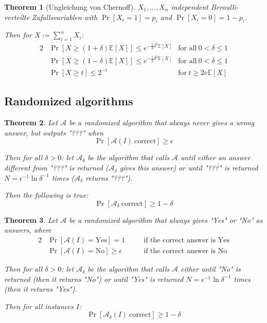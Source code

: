 \documentclass[12pt]{extarticle}
\theoremstyle{definition}
\theoremstyle{remark}
\theoremstyle{plain}
\newtheorem{theorem}{Theorem}
\theoremstyle{plain}
\theoremstyle{plain}
\newcommand{\E}{\mathbb{E}}
\begin{document}
\begin{theorem}[Ungleichung von Chernoff]
    $X_1, ..., X_n$ independent Beroulli-verteilte Zufallsvariablen with $\Pr[X_i = 1] = p_i$ and $\Pr[X_i = 0] = 1 - p_i$.

    Then for $X := \sum_{i=1}^n X_i$:
    \begin{alignat}{2}
         & \Pr[X \ge (1 + \delta)\E[X]] \le e^{-\frac{1}{3} \delta^2 \E[X]} & \mbox{for all}\ 0 < \delta \le 1 \\
         & \Pr[X \ge (1 - \delta)\E[X]] \le e^{-\frac{1}{2} \delta^2 \E[X]} & \mbox{for all}\ 0 < \delta \le 1 \\
         & \Pr[X \ge t] \le 2^{-t}                                          & \mbox{for}\ t \ge 2e \E[X]
    \end{alignat}
\end{theorem}

\subsection{Randomized algorithms}
\begin{theorem}
    Let $\mathcal{A}$ be a randomized algorithm that always never gives a wrong answer, but outputs "???" when
    \[ \Pr[\mathcal{A}(I)\ \mbox{correct}] \ge \epsilon \]

    Then for all $\delta > 0$:
    let $\mathcal{A}_\delta$ be the algorithm that calls $\mathcal{A}$ until either an answer different from "???" is returned ($\mathcal{A}_\delta$ gives
    this answer) or until "???" is returned $N = \epsilon^{-1} \ln \delta^{-1}$ times ($\mathcal{A}_\delta$ returns "???").

    Then the following is true:
    \[ \Pr[\mathcal{A}_\delta\ \mbox{correct}] \ge 1 - \delta \]
\end{theorem}

\begin{theorem}
    Let $\mathcal{A}$ be a randomized algorithm that always gives "Yes" or "No" as answers, where
    \begin{alignat}{2}
         & \Pr[\mathcal{A}(I) = \mbox{Yes}] = 1         &  & \quad\mbox{if the correct answer is Yes} \\
         & \Pr[\mathcal{A}(I) = \mbox{No}] \ge \epsilon &  & \quad\mbox{if the correct answer is No}
    \end{alignat}

    Then for all $\delta > 0$: let $\mathcal{A}_\delta$ be the algorithm that calls $\mathcal{A}$ either until "No" is returned
    (then it returns "No") or until "Yes" is returned $N = \epsilon^{-1} \ln \delta^{-1}$ times (then it returns "Yes").

    Then for all instances $I$:
    \[ \Pr[\mathcal{A}_\delta(I)\ \mbox{correct}] \ge 1 - \delta \]
\end{theorem}
\end{document}

